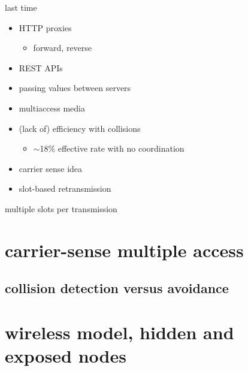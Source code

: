 \date{}
\title{}
\date{}
\usepackage{pgfplots}
\pgfplotsset{compat=1.14}

\begin{frame}
    \titlepage
\end{frame}

\begin{frame}{last time}
    \begin{itemize}
    \item HTTP proxies
        \begin{itemize}
        \item forward, reverse
        \end{itemize}
    \item REST APIs
    \item passing values between servers
    \item multiaccess media
    \item (lack of) efficiency with collisions
        \begin{itemize}
        \item $\sim$18\% effective rate with no coordination
        \end{itemize}
    \item carrier sense idea
    \item slot-based retransmission
    \end{itemize}
\end{frame}

\begin{frame}{multiple slots per transmission}
\end{frame}


\section{carrier-sense multiple access}


\subsection{collision detection versus avoidance}


\section{wireless model, hidden and exposed nodes} 


